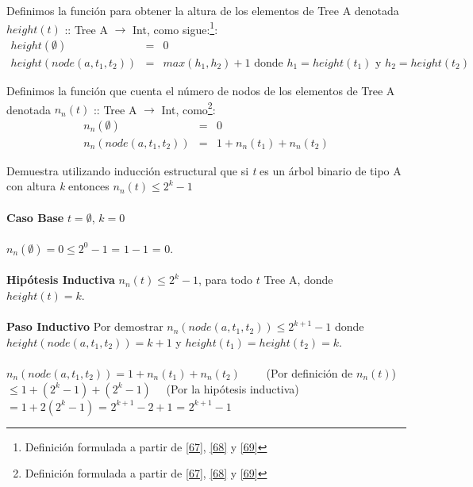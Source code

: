   \begin{definition}
        Definimos la función para obtener la altura de los elementos de Tree A denotada $height(t)$ :: Tree A $\rightarrow$ Int,  como sigue:\footnote{Definición formulada a partir de \hyperlink{67}{[67]}, \hyperlink{68}{[68]} y \hyperlink{69}{[69]}}:
       \[
            \begin{array}{rcl}
            	height(\emptyset) & = & 0 \\
           	height(node(a,t_1,t_2)) & = & max(h_1,h_2) + 1 \text{ donde } h_1 = height(t_1) \text{ y } h_2 = height(t_2)
         \end{array}
        \]
    \end{definition}
  
    \begin{definition}
        Definimos la función que cuenta el número de nodos de los elementos de Tree A denotada $n_n(t)$ :: Tree A $\rightarrow$ Int,  como\footnote{Definición formulada a partir de \hyperlink{67}{[67]}, \hyperlink{68}{[68]} y \hyperlink{69}{[69]}}:
        \[
            \begin{array}{rcl}
                 n_n(\emptyset)     &  =  & 0  \\
                 n_n(node(a,t_1,t_2))&  =  &1+ n_n(t_1)+n_n(t_2) 
            \end{array}
        \]

    \end{definition}

    \begin{exercise}
        Demuestra utilizando inducción estructural que si \textit{t} es un árbol binario de tipo A con altura \textit{k} entonces $n_n(t) \leq 2^k - 1$ \\\\
        \textbf{Caso Base} $t = \emptyset$, $k=0$\\\\
            $n_n(\emptyset) = 0  \leq 2^0 -1 $ = $1 -1$ = 0.\\\\
        \textbf{Hipótesis Inductiva} $n_n(t) \leq 2^k - 1$,  para todo $t$ Tree A, donde $height(t)=k$. \\\\
        \textbf{Paso Inductivo} Por demostrar $n_n(node(a,t_1,t_2)) \leq 2^{k+1} - 1$ donde $height(node(a,t_1,t_2)) = k + 1$ y $height(t_1) = height(t_2) = k$.\\\\
            $n_n(node(a,t_1,t_2)) = 1 + n_n(t_1) + n_n(t_2)$ \quad \quad \quad \quad \quad \quad \ \ \ \  (Por definición de $n_n(t)$) \\
            $\leq 1 + (2^{k} - 1) + (2^{k} - 1)$ \qquad \qquad \qquad \qquad \qquad \qquad  \ \ (Por la hipótesis inductiva) \\
            $= 1 + 2(2^{k} - 1)$ = $2^{k+1} - 2 + 1$ = $2^{k+1} - 1$\\
    \end{exercise}

